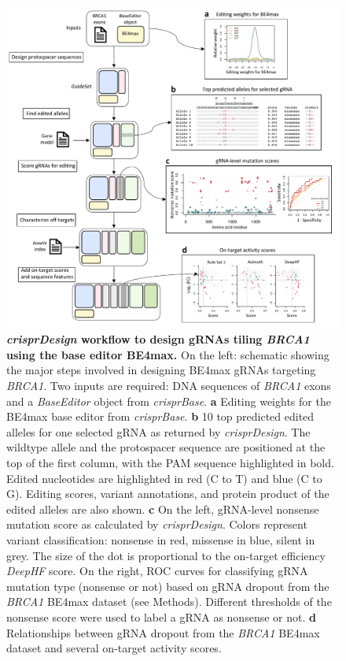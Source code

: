\documentclass[pdftex,english,10pt]{article}
\begin{document}
\begin{figure}
\centering
\includegraphics[width=1\textwidth]{analyses/crisprbe/figures/crisprbe.pdf}
  \caption{\textbf{\textit{crisprDesign} workflow to design gRNAs tiling \textit{BRCA1} using the base editor BE4max.}
On the left: schematic showing the major steps involved in designing BE4max gRNAs targeting \textit{BRCA1}.
Two inputs are required: DNA sequences of \textit{BRCA1} exons and a 
\textit{BaseEditor} object from \textit{crisprBase}. 
   \textbf{a} Editing weights for the BE4max base editor from \textit{crisprBase}.   
   \textbf{b} 10 top predicted edited alleles for one selected gRNA as returned by \textit{crisprDesign}. The wildtype allele and the protospacer sequence are positioned at the top of the first column, with the PAM sequence highlighted in bold. Edited nucleotides are highlighted in red (C to T) and blue (C to G). Editing scores, variant annotations, and protein product of the edited alleles are also shown.
   \textbf{c} On the left, gRNA-level nonsense mutation score as calculated by \textit{crisprDesign}. Colors represent variant classification: nonsense in red, missense in blue, silent in grey. The size of the dot is proportional to the on-target efficiency \textit{DeepHF} score. On the right, ROC curves for classifying gRNA mutation type (nonsense or not) based on gRNA dropout from the \textit{BRCA1} BE4max dataset (see Methods). Different thresholds of the nonsense score were used to label a gRNA as nonsense or not.  \textbf{d} Relationships between gRNA dropout from the \textit{BRCA1} BE4max dataset and several on-target activity scores.
}
\end{figure}
\end{document}
